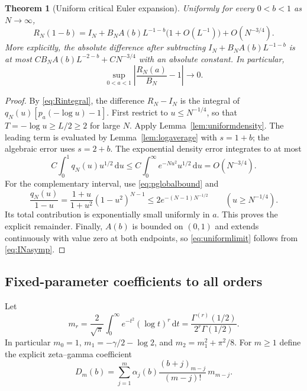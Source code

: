 \documentclass[11pt]{article}
\numberwithin{equation}{section}
\newtheorem{theorem}{Theorem}[section]
\theoremstyle{definition}\newtheorem{definition}[theorem]{Definition}
\theoremstyle{remark}\newtheorem{remark}[theorem]{Remark}
\newcommand{\dd}{\,\mathrm d}
\begin{document}
\begin{theorem}[Uniform critical Euler expansion]\label{thm:uniformEuler}
Uniformly for every $0<b<1$ as $N\to\infty$,
\begin{equation}\label{eq:uniformEuler}
 R_N(1-b)=I_N+B_NA(b)L^{-1-b}\bigl(1+O(L^{-1})\bigr)
                   +O(N^{-3/4}).
\end{equation}
More explicitly, the absolute difference after subtracting
$I_N+B_NA(b)L^{-1-b}$ is at most
$C B_NA(b)L^{-2-b}+C N^{-3/4}$ with an absolute constant.
In particular,
\begin{equation}\label{eq:uniformlimit}
 \sup_{0<a<1}\left|\frac{R_N(a)}{B_N}-1\right|\longrightarrow0.
\end{equation}
\end{theorem}
\begin{proof}
By \eqref{eq:Rintegral}, the difference $R_N-I_N$ is the integral of
$q_N(u)[p_a(-\log u)-1]$. First restrict to $u\le N^{-1/4}$, so that
$T=-\log u\ge L/2\ge2$ for large $N$. Apply
Lemma~\ref{lem:uniformdensity}. The leading term is evaluated by
Lemma~\ref{lem:logaverage} with $s=1+b$; the algebraic error uses
$s=2+b$. The exponential density error integrates to at most
\[
 C\int_0^1q_N(u)u^{1/2}\dd u
 \le C\int_0^\infty e^{-Nu^2}u^{1/2}\dd u=O(N^{-3/4}).
\]
For the complementary interval, use \eqref{eq:pglobalbound} and
\[
 \frac{q_N(u)}{1-u}
 =\frac{1+u}{1+u^2}(1-u^2)^{N-1}
 \le2e^{-(N-1)N^{-1/2}}\qquad(u\ge N^{-1/4}).
\]
Its total contribution is exponentially small uniformly in $a$.
This proves the explicit remainder. Finally, $A(b)$ is bounded on
$(0,1)$ and extends continuously with value zero at both endpoints,
so \eqref{eq:uniformlimit} follows from \eqref{eq:INasymp}.
\end{proof}

\subsection{Fixed-parameter coefficients to all orders}
Let
\begin{equation}\label{eq:logmoments}
 m_r=\frac{2}{\sqrt\pi}\int_0^\infty e^{-t^2}(\log t)^r\dd t
 =\frac{\Gamma^{(r)}(1/2)}{2^r\Gamma(1/2)}.
\end{equation}
In particular $m_0=1$, $m_1=-\gamma/2-\log2$, and
$m_2=m_1^2+\pi^2/8$.
For $m\ge1$ define the explicit zeta--gamma coefficient
\begin{equation}\label{eq:Dm}
 D_m(b)=\sum_{j=1}^m\alpha_j(b)
 \frac{(b+j)_{m-j}}{(m-j)!}\,m_{m-j}.
\end{equation}
\end{document}
